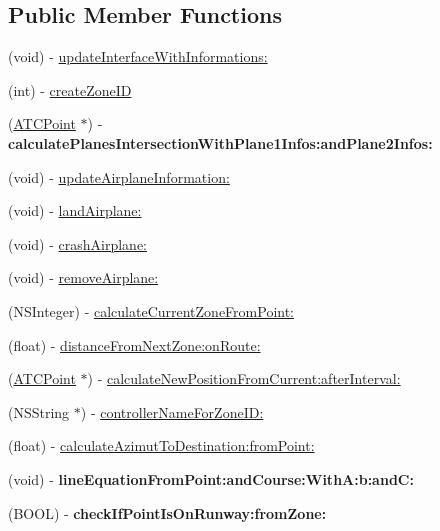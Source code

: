 \subsection*{\-Public \-Member \-Functions}
\begin{DoxyCompactItemize}
\item 
(void) -\/ \hyperlink{protocol_artifacts_delegate-p_ab126cb115bd250e03117358ee7d9ce58}{update\-Interface\-With\-Informations\-:}
\item 
(int) -\/ \hyperlink{protocol_artifacts_delegate-p_a6d2f14d38897bb71758447e26f1ef335}{create\-Zone\-I\-D}
\item 
\hypertarget{protocol_artifacts_delegate-p_a7467cc84b34ecc4adffaa5e03f27d524}{
(\hyperlink{interface_a_t_c_point}{\-A\-T\-C\-Point} $\ast$) -\/ {\bfseries calculate\-Planes\-Intersection\-With\-Plane1\-Infos\-:and\-Plane2\-Infos\-:}}
\label{protocol_artifacts_delegate-p_a7467cc84b34ecc4adffaa5e03f27d524}

\item 
(void) -\/ \hyperlink{protocol_artifacts_delegate-p_a819d9706a61adbefd1cde3129a5302d1}{update\-Airplane\-Information\-:}
\item 
(void) -\/ \hyperlink{protocol_artifacts_delegate-p_a6240e7bc0746d8d4013dc748907d8cd2}{land\-Airplane\-:}
\item 
(void) -\/ \hyperlink{protocol_artifacts_delegate-p_afd62a02fca4f76ab726adad37748acbc}{crash\-Airplane\-:}
\item 
(void) -\/ \hyperlink{protocol_artifacts_delegate-p_ae52932443f640e0a80ff0cb653fc6684}{remove\-Airplane\-:}
\item 
(\-N\-S\-Integer) -\/ \hyperlink{protocol_artifacts_delegate-p_a7853374c9472cadfb53237833298b935}{calculate\-Current\-Zone\-From\-Point\-:}
\item 
(float) -\/ \hyperlink{protocol_artifacts_delegate-p_a9058a8fd4599a2e2a1f514114dbe6f03}{distance\-From\-Next\-Zone\-:on\-Route\-:}
\item 
(\hyperlink{interface_a_t_c_point}{\-A\-T\-C\-Point} $\ast$) -\/ \hyperlink{protocol_artifacts_delegate-p_a5f198490fb7fc6450c4f8efd0b912884}{calculate\-New\-Position\-From\-Current\-:after\-Interval\-:}
\item 
(\-N\-S\-String $\ast$) -\/ \hyperlink{protocol_artifacts_delegate-p_ac984d3c52657bbbbbb075001df6a8991}{controller\-Name\-For\-Zone\-I\-D\-:}
\item 
(float) -\/ \hyperlink{protocol_artifacts_delegate-p_aeffe6d6022ce0292fbc7895f6b364444}{calculate\-Azimut\-To\-Destination\-:from\-Point\-:}
\item 
\hypertarget{protocol_artifacts_delegate-p_a21bf2377f2374eeb0d8b513509e21025}{
(void) -\/ {\bfseries line\-Equation\-From\-Point\-:and\-Course\-:\-With\-A\-:b\-:and\-C\-:}}
\label{protocol_artifacts_delegate-p_a21bf2377f2374eeb0d8b513509e21025}

\item 
\hypertarget{protocol_artifacts_delegate-p_ac47c0ea58dbe774076a4876644150e6f}{
(\-B\-O\-O\-L) -\/ {\bfseries check\-If\-Point\-Is\-On\-Runway\-:from\-Zone\-:}}
\label{protocol_artifacts_delegate-p_ac47c0ea58dbe774076a4876644150e6f}

\end{DoxyCompactItemize}


